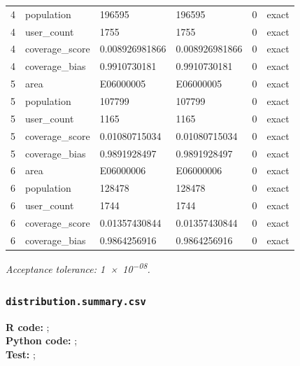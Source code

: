 \documentclass[10pt]{article}
\begin{document}
\begin{longtable}{@{}r p{}p{}p{}rl@{}}
4 & population & 196595 & 196595 & 0 & exact \\
4 & user\_\allowbreak{}count & 1755 & 1755 & 0 & exact \\
4 & coverage\_\allowbreak{}score & 0.008926981866 & 0.008926981866 & 0 & exact \\
4 & coverage\_\allowbreak{}bias & 0.9910730181 & 0.9910730181 & 0 & exact \\
5 & area & E06000005 & E06000005 & 0 & exact \\
5 & population & 107799 & 107799 & 0 & exact \\
5 & user\_\allowbreak{}count & 1165 & 1165 & 0 & exact \\
5 & coverage\_\allowbreak{}score & 0.01080715034 & 0.01080715034 & 0 & exact \\
5 & coverage\_\allowbreak{}bias & 0.9891928497 & 0.9891928497 & 0 & exact \\
6 & area & E06000006 & E06000006 & 0 & exact \\
6 & population & 128478 & 128478 & 0 & exact \\
6 & user\_\allowbreak{}count & 1744 & 1744 & 0 & exact \\
6 & coverage\_\allowbreak{}score & 0.01357430844 & 0.01357430844 & 0 & exact \\
6 & coverage\_\allowbreak{}bias & 0.9864256916 & 0.9864256916 & 0 & exact \\
\bottomrule
\end{longtable}
\normalsize
\textit{Acceptance tolerance: \num{1e-08}.}

\subsubsection{\texorpdfstring{\texttt{distribution.summary.csv}}{distribution.summary.csv}}
{\footnotesize \textbf{R code:} ; \\ \textbf{Python code:} ; \\ \textbf{Test:} ; \par}
\end{document}
